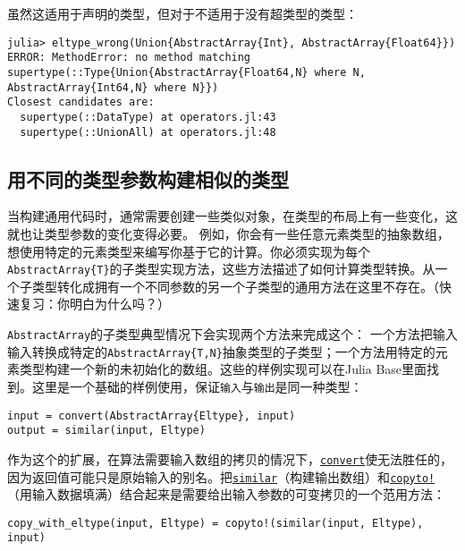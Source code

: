 虽然这适用于声明的类型，但对于不适用于没有超类型的类型：




\begin{verbatim}
julia> eltype_wrong(Union{AbstractArray{Int}, AbstractArray{Float64}})
ERROR: MethodError: no method matching supertype(::Type{Union{AbstractArray{Float64,N} where N, AbstractArray{Int64,N} where N}})
Closest candidates are:
  supertype(::DataType) at operators.jl:43
  supertype(::UnionAll) at operators.jl:48
\end{verbatim}



\hypertarget{7211262558234007578}{}


\subsection{用不同的类型参数构建相似的类型}



当构建通用代码时，通常需要创建一些类似对象，在类型的布局上有一些变化，这就也让类型参数的变化变得必要。 例如，你会有一些任意元素类型的抽象数组，想使用特定的元素类型来编写你基于它的计算。你必须实现为每个\texttt{AbstractArray\{T\}}的子类型实现方法，这些方法描述了如何计算类型转换。从一个子类型转化成拥有一个不同参数的另一个子类型的通用方法在这里不存在。（快速复习：你明白为什么吗？）



\texttt{AbstractArray}的子类型典型情况下会实现两个方法来完成这个： 一个方法把输入输入转换成特定的\texttt{AbstractArray\{T,N\}}抽象类型的子类型；一个方法用特定的元素类型构建一个新的未初始化的数组。这些的样例实现可以在Julia Base里面找到。这里是一个基础的样例使用，保证\texttt{输入}与\texttt{输出}是同一种类型：




\begin{verbatim}
input = convert(AbstractArray{Eltype}, input)
output = similar(input, Eltype)
\end{verbatim}



作为这个的扩展，在算法需要输入数组的拷贝的情况下，\hyperlink{1846942650946171605}{\texttt{convert}}使无法胜任的，因为返回值可能只是原始输入的别名。把\hyperlink{15525808546723795098}{\texttt{similar}}（构建输出数组）和\hyperlink{12476124489163612623}{\texttt{copyto!}}（用输入数据填满）结合起来是需要给出输入参数的可变拷贝的一个范用方法：




\begin{verbatim}
copy_with_eltype(input, Eltype) = copyto!(similar(input, Eltype), input)
\end{verbatim}



